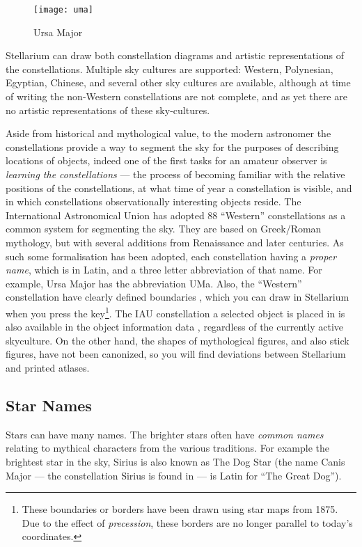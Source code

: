 \begin{figure}[hb]
\centering\texttt{[image: uma]}
\caption{Ursa Major}
\label{fig:ursamajor}
\end{figure}


Stellarium can draw both constellation diagrams and artistic
representations of the constellations. Multiple sky cultures are
supported: Western, Polynesian, Egyptian, Chinese, and several other sky cultures are
available, although at time of writing the non-Western constellations
are not complete, and as yet there are no artistic representations of
these sky-cultures.

Aside from historical and mythological value, to the modern astronomer
the constellations provide a way to segment the sky for the purposes
of describing locations of objects, indeed one of the first tasks for
an amateur observer is \emph{learning the constellations} --- the
process of becoming familiar with the relative positions of the
constellations, at what time of year a constellation is visible, and
in which constellations observationally interesting objects reside.
The International Astronomical Union has adopted 88 ``Western''
constellations as a common system for segmenting the sky. They are
based on Greek/Roman mythology, but with several additions from
Renaissance and later centuries.  As such some formalisation has been
adopted, each constellation having a \emph{proper name}, which is in
Latin, and a three letter abbreviation of that name.  For example,
Ursa Major has the abbreviation UMa. Also, the ``Western''
constellation have clearly defined boundaries \cite{Delporte:1930}, which you can draw in
Stellarium when you press the  key\footnote{These boundaries or
  borders have been drawn using star maps from 1875. Due to the effect
  of \emph{precession}, these borders are no longer parallel to
  today's coordinates.}. The IAU constellation a selected object is placed in 
is also available in the object information data \cite{1987PASP...99..695R}, 
regardless of the currently active skyculture.  On the other hand, the shapes 
of mythological figures, and also stick figures, have not been canonized, so 
you will find deviations between Stellarium and printed atlases.

\subsection{Star Names}
\label{sec:Phenomena:StarNames}

Stars can have many names. The brighter stars often have \emph{common
names} relating to mythical characters from the various traditions. For
example the brightest star in the sky, Sirius is also known as The Dog
Star (the name Canis Major --- the constellation Sirius is found in ---
is Latin for ``The Great Dog''). 

